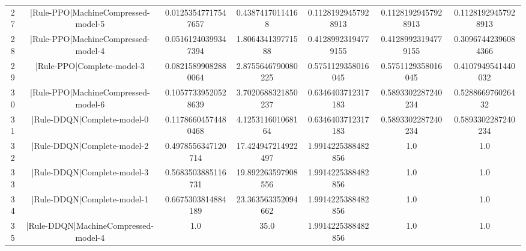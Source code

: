 \documentclass[a3paper,10pt]{article}
\begin{document}
\begin{table}[!htp]
\begin{tabular}{ccccccc}
27&|Rule-PPO|MachineCompressed-model-5&0.01253547717547657&0.43874170114168&0.11281929457928913&0.11281929457928913&0.11281929457928913\\
28&|Rule-PPO|MachineCompressed-model-4&0.05161240399347394&1.806434139771588&0.41289923194779155&0.41289923194779155&0.30967442396084366\\
29&|Rule-PPO|Complete-model-3&0.08215899082880064&2.8755646790080225&0.5751129358016045&0.5751129358016045&0.4107949541440032\\
30&|Rule-PPO|MachineCompressed-model-6&0.10577339520528639&3.7020688321850237&0.6346403712317183&0.5893302287240234&0.528866976026432\\
31&|Rule-DDQN|Complete-model-0&0.11786604574480468&4.125311601068164&0.6346403712317183&0.5893302287240234&0.5893302287240234\\
32&|Rule-DDQN|Complete-model-2&0.4978556347120714&17.424947214922497&1.9914225388482856&1.0&1.0\\
33&|Rule-DDQN|Complete-model-3&0.5683503885116731&19.892263597908556&1.9914225388482856&1.0&1.0\\
34&|Rule-DDQN|Complete-model-1&0.6675303814884189&23.363563352094662&1.9914225388482856&1.0&1.0\\
35&|Rule-DDQN|MachineCompressed-model-4&1.0&35.0&1.9914225388482856&1.0&1.0\\
\hline
\end{tabular}
\end{table}
\end{document}

